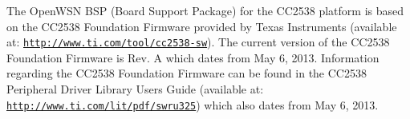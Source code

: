 The Open\+W\+SN B\+SP (Board Support Package) for the C\+C2538 platform is based on the C\+C2538 Foundation Firmware provided by Texas Instruments (available at\+: \href{http://www.ti.com/tool/cc2538-sw}{\tt http\+://www.\+ti.\+com/tool/cc2538-\/sw}). The current version of the C\+C2538 Foundation Firmware is Rev. A which dates from May 6, 2013. Information regarding the C\+C2538 Foundation Firmware can be found in the C\+C2538 Peripheral Driver Library User\textquotesingle{}s Guide (available at\+: \href{http://www.ti.com/lit/pdf/swru325}{\tt http\+://www.\+ti.\+com/lit/pdf/swru325}) which also dates from May 6, 2013. 